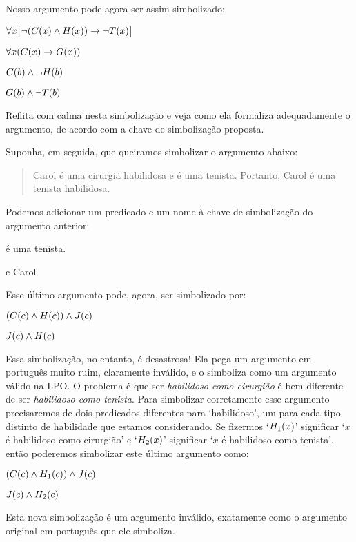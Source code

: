 Nosso argumento pode agora ser assim simbolizado:
\begin{earg}
\item[] $\forall x\bigl[\neg (\mathord{C}(x) \wedge \mathord{H}(x)) \rightarrow \neg \mathord{T}(x)\bigr]$
\item[] $\forall x(\mathord{C}(x) \rightarrow \mathord{G}(x))$
\item[] $\mathord{C}(b) \wedge \neg \mathord{H}(b)$
\item[\therefore] $\mathord{G}(b) \wedge \neg \mathord{T}(b)$
\label{surgeon2}
\end{earg}
Reflita com calma nesta simbolização e veja como ela formaliza adequadamente o argumento, de acordo com a chave de simbolização proposta.

Suponha, em seguida, que queiramos simbolizar o argumento abaixo:
\begin{quote}
\label{surgeon3}
Carol é uma cirurgiã habilidosa e é uma tenista. Portanto, Carol é uma tenista habilidosa.
\end{quote}
Podemos adicionar um predicado e um nome à chave de simbolização do argumento anterior:
\begin{center}
\begin{ekey}
	\item[\atom{J}{x}]  é uma tenista.
	\item[c] Carol
\end{ekey}
\end{center}
Esse último argumento pode, agora, ser simbolizado por:
\begin{earg}
\item[] $(\mathord{C}(c) \wedge \mathord{H}(c)) \wedge \mathord{J}(c)$
\item[\therefore] $\mathord{J}(c) \wedge \mathord{H}(c)$
\end{earg}
Essa simbolização, no entanto, é desastrosa!
Ela pega um argumento em português muito ruim, claramente inválido, e o simboliza como um argumento válido na LPO.
O problema é que ser \emph{habilidoso como cirurgião} é bem diferente de ser \emph{habilidoso como tenista}.
Para simbolizar corretamente esse argumento precisaremos de dois predicados diferentes para `habilidoso', um para cada tipo distinto de habilidade que estamos considerando.
Se fizermos `$\mathord{H_1}(x)$' significar `$x$ é habilidoso como cirurgião' e `$\mathord{H_2}(x)$' significar `$x$ é habilidoso como tenista', então poderemos simbolizar este último argumento como:
\begin{earg}
\item[] $(\mathord{C}(c) \wedge \mathord{H_1}(c)) \wedge \mathord{J}(c)$
\item[\therefore] $\mathord{J}(c) \wedge \mathord{H_2}(c)$
\label{surgeon3correct}
\end{earg}
Esta nova simbolização é um argumento inválido, exatamente como o argumento original em português que ele simboliza.

